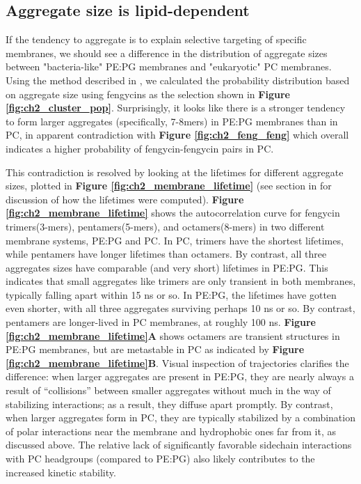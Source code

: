 \subsection{Aggregate size is lipid-dependent}
\label{subsec:ch2_aggregate_size}

If the tendency to aggregate is to explain selective targeting of specific
membranes, we should see a difference in the distribution of aggregate sizes
between "bacteria-like" PE:PG membranes and "eukaryotic" PC membranes. Using the
\textbf{} method described in \textbf{},  we
calculated the probability distribution  based on aggregate size using fengycins
as the selection shown in \textbf{Figure \ref{fig:ch2_cluster_pop}}. Surprisingly, it looks like
there is a stronger tendency to form larger aggregates (specifically, 7-8mers)
in PE:PG membranes than in PC, in apparent contradiction with \textbf{Figure
\ref{fig:ch2_feng_feng}} which overall indicates a higher probability of
fengycin-fengycin pairs in PC.

This contradiction is resolved by looking at the lifetimes for
different aggregate sizes, plotted in \textbf{Figure \ref{fig:ch2_membrane_lifetime}} (see
section \textbf{} in \textbf{} for
 discussion of how the lifetimes were computed). \textbf{Figure
\ref{fig:ch2_membrane_lifetime}} shows the autocorrelation curve for
fengycin trimers(3-mers), pentamers(5-mers), and octamers(8-mers) in two different membrane systems, PE:PG and PC.
In PC, trimers have the shortest lifetimes, while
pentamers have longer lifetimes than octamers. By contrast, all three
aggregates sizes have comparable (and very short) lifetimes in PE:PG.
This indicates that small aggregates like trimers are only transient in both membranes,
typically falling apart within 15 ns or so. In PE:PG, the lifetimes have gotten even shorter, with all three aggregates
surviving perhaps 10 ns or so. By contrast, pentamers are longer-lived in PC
membranes, at roughly 100 ns. \textbf{Figure \ref{fig:ch2_membrane_lifetime}A} shows octamers
 are transient structures in PE:PG membranes, but are
metastable in PC as indicated by \textbf{Figure \ref{fig:ch2_membrane_lifetime}B}.
Visual inspection of trajectories clarifies the difference:
when larger aggregates are present in PE:PG, they are nearly always a result of
``collisions'' between smaller aggregates without much in the way of stabilizing
interactions; as a result, they diffuse apart promptly. By contrast, when
larger aggregates form in PC, they are typically stabilized by a combination of
polar interactions near the membrane and hydrophobic ones far from it, as
discussed above. The relative lack of significantly favorable sidechain
interactions with PC headgroups (compared to PE:PG) also likely contributes to
the increased kinetic stability.

